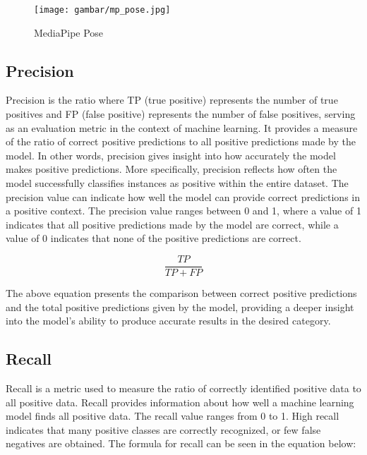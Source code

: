 \begin{figure}[H]
  \centering

  \texttt{[image: gambar/mp\_pose.jpg]}

  \caption{MediaPipe Pose}
  \label{fig:Pose MediaPipe}
\end{figure}

\subsection*{Precision}
Precision is the ratio where TP (true positive) represents the number of true positives and FP (false positive) represents the number of false positives, serving as an evaluation metric in the context of machine learning. It provides a measure of the ratio of correct positive predictions to all positive predictions made by the model. In other words, precision gives insight into how accurately the model makes positive predictions. More specifically, precision reflects how often the model successfully classifies instances as positive within the entire dataset. The precision value can indicate how well the model can provide correct predictions in a positive context. The precision value ranges between 0 and 1, where a value of 1 indicates that all positive predictions made by the model are correct, while a value of 0 indicates that none of the positive predictions are correct.

\begin{equation}
    \frac{TP}{TP+FP}
\end{equation}

The above equation presents the comparison between correct positive predictions and the total positive predictions given by the model, providing a deeper insight into the model's ability to produce accurate results in the desired category.

\subsection*{Recall}
Recall is a metric used to measure the ratio of correctly identified positive data to all positive data. Recall provides information about how well a machine learning model finds all positive data. The recall value ranges from 0 to 1. High recall indicates that many positive classes are correctly recognized, or few false negatives are obtained. The formula for recall can be seen in the equation below:

